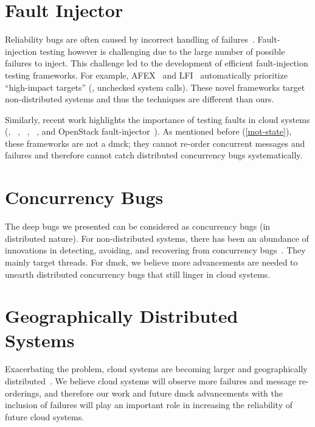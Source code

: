 \section{Fault Injector}
Reliability bugs are often caused by incorrect handling of
failures~\cite{Gunawi+11-FateDestini, Gunawi+08-EIO}.  Fault-injection
testing however is challenging due to the large number of possible
failures to inject.  This challenge led to the development of
efficient fault-injection testing frameworks.  For example,
AFEX~\cite{Banabic+12-Blackbox} and
LFI~\cite{Marinescu+10-ExtensibleLFI} automatically prioritize
``high-impact targets'' (\eg, unchecked system calls).  These novel
frameworks target non-distributed systems and thus the techniques are
different than ours.


Similarly, recent work highlights the importance of testing faults in
cloud systems (\eg, \fate~\cite{Gunawi+11-FateDestini},
\setsudo~\cite{Joshi+13-SetsudoTesting},
\prefail~\cite{Joshi+11-PreFail}, and OpenStack
fault-injector~\cite{Ju+13-FaultResOpenStack}).  As mentioned before
(\sec\ref{mot-state}), these frameworks are not a dmck; they cannot
re-order concurrent messages and failures and therefore cannot catch
distributed concurrency bugs systematically.



\section{Concurrency Bugs}
The deep bugs we presented can be considered as concurrency bugs (in
distributed nature).  For non-distributed systems, there has been an
abundance of innovations in detecting, avoiding, and recovering from
concurrency bugs~\cite{Jin+12-CFix,
  Kasikci+13-CrowdRaceMob, 
  Lu+08-ConcurrencyBugStudy, 
  Veeraraghavan+11-ComplementarySchedules}.
They mainly target threads.  For dmck, we believe more advancements
are needed to unearth distributed concurrency bugs that still linger
in cloud systems.

\section{Geographically Distributed Systems}
%
Exacerbating the
  problem, cloud systems are becoming larger and geographically
  distributed~\cite{Lloyd+11-Cops, Terry+13-PileusConsistencySLA,
    Zhang+13-TransactionChains}.  We believe cloud systems will observe
  more failures and message re-orderings, and therefore our work and future
  dmck advancements with the inclusion of failures will play an important
  role in increasing the reliability of future cloud systems.


